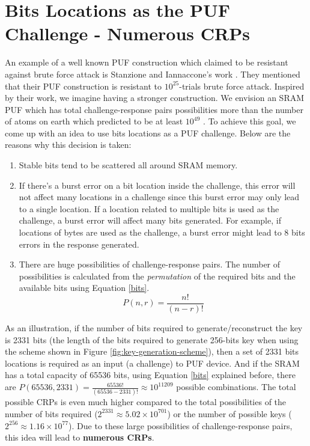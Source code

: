 \section{Bits Locations as the PUF Challenge - Numerous CRPs}
An example of a well known PUF construction which claimed to be resistant against brute force attack is Stanzione and Iannaccone's work \cite{Stanzione}. They mentioned that their PUF construction is resistant to $10^{25}$-trials brute force attack. Inspired by their work, we imagine having a stronger construction. We envision an SRAM PUF which has total challenge-response pairs possibilities more than the number of atoms on earth which predicted to be at least $10^{49}$ \cite{atoms_earth}. To achieve this goal, we come up with an idea to use bits locations as a PUF challenge.
Below are the reasons why this decision is taken:
\begin{enumerate}
    \item Stable bits tend to be scattered all around SRAM memory.
    \item If there's a burst error on a bit location inside the challenge, this error will not affect many locations in a challenge since this burst error may only lead to a single location. If a location related to multiple bits is used as the challenge, a burst error will affect many bits generated. For example, if locations of bytes are used as the challenge, a burst error might lead to 8 bits errors in the response generated.
    \item There are huge possibilities of challenge-response pairs. The number of possibilities is calculated from the \textit{permutation} of the required bits and the available bits using Equation \ref{bits}.
    \begin{equation}
        \label{bits}
        P(n,r)=\frac{n!}{\left( n-r \right) !}
    \end{equation}
\end{enumerate}
As an illustration, if the number of bits required to generate/reconstruct the key is 2331 bits (the length of the bits required to generate 256-bits key when using the scheme shown in Figure \ref{fig:key-generation-scheme}), then a set of 2331 bits locations is required as an input (a challenge) to PUF device. And if the SRAM has a total capacity of 65536 bits, using Equation \ref{bits} explained before, there are $P(65536, 2331)=\frac{65536!}{\left( 65536-2331 \right) !}\approx 10^{11209}$ possible combinations. The total possible CRPs is even much higher compared to the total possibilities of the number of bits required ($2^{2331}\approx5.02\times10^{701}$) or the number of possible keys ($2^{256}\approx1.16\times10^{77}$).
Due to these large possibilities of challenge-response pairs, this idea will lead to \textbf{numerous CRPs}.

